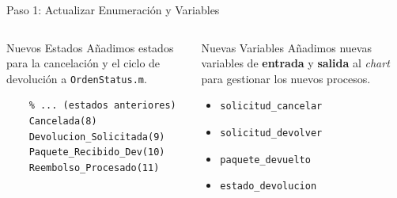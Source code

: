 \documentclass[aspectratio=169,xcolor=dvipsnames]{beamer}
\begin{document}

\begin{frame}[fragile]{Paso 1: Actualizar Enumeración y Variables}
    \begin{columns}[t]
            \begin{alertblock}{Nuevos Estados}
            Añadimos estados para la cancelación y el ciclo de devolución a \texttt{OrdenStatus.m}.
            \begin{lstlisting}
    % ... (estados anteriores)
    Cancelada(8)
    Devolucion_Solicitada(9)
    Paquete_Recibido_Dev(10)
    Reembolso_Procesado(11)
            \end{lstlisting}
            \end{alertblock}
            \begin{block}{Nuevas Variables}
            Añadimos nuevas variables de \textbf{entrada} y \textbf{salida} al \textit{chart} para gestionar los nuevos procesos.
                \begin{itemize}
                    \item \texttt{solicitud\_cancelar}
                    \item \texttt{solicitud\_devolver}
                    \item \texttt{paquete\_devuelto}
                    \item \texttt{estado\_devolucion}
                \end{itemize}
            \end{block}
    \end{columns}
\end{frame}

\end{document}
